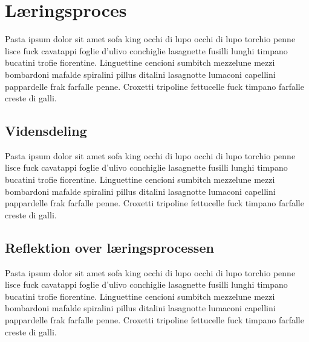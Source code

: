 \chapter{Læringsproces}
Pasta ipsum dolor sit amet sofa king occhi di lupo occhi di lupo torchio penne lisce fuck cavatappi foglie d'ulivo conchiglie lasagnette fusilli lunghi timpano bucatini trofie fiorentine. Linguettine cencioni sumbitch mezzelune mezzi bombardoni mafalde spiralini pillus ditalini lasagnotte lumaconi capellini pappardelle frak farfalle penne. Croxetti tripoline fettucelle fuck timpano farfalle creste di galli.

\section{Vidensdeling}
Pasta ipsum dolor sit amet sofa king occhi di lupo occhi di lupo torchio penne lisce fuck cavatappi foglie d'ulivo conchiglie lasagnette fusilli lunghi timpano bucatini trofie fiorentine. Linguettine cencioni sumbitch mezzelune mezzi bombardoni mafalde spiralini pillus ditalini lasagnotte lumaconi capellini pappardelle frak farfalle penne. Croxetti tripoline fettucelle fuck timpano farfalle creste di galli.

\section{Reflektion over læringsprocessen}
Pasta ipsum dolor sit amet sofa king occhi di lupo occhi di lupo torchio penne lisce fuck cavatappi foglie d'ulivo conchiglie lasagnette fusilli lunghi timpano bucatini trofie fiorentine. Linguettine cencioni sumbitch mezzelune mezzi bombardoni mafalde spiralini pillus ditalini lasagnotte lumaconi capellini pappardelle frak farfalle penne. Croxetti tripoline fettucelle fuck timpano farfalle creste di galli.